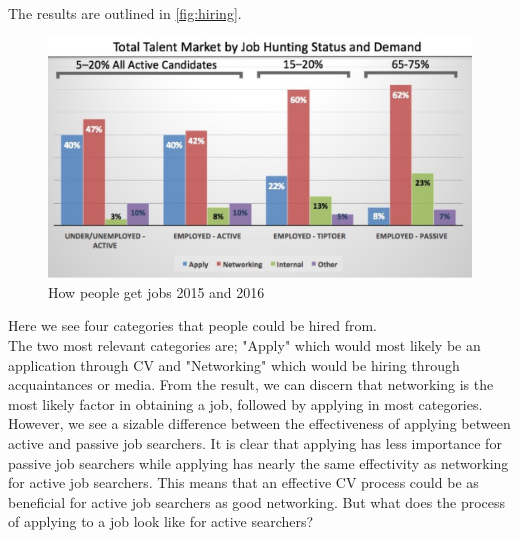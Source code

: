 The results are outlined in \vref{fig:hiring}.
\begin{figure}[H]
   \centering
   \includegraphics[scale = 0.5]{figures/hiringpeople}
   \caption{How people get jobs 2015 and 2016 \cite{Networking}}
   \label{fig:hiring}
 \end{figure}

Here we see four categories that people could be hired from. \\

The two most relevant categories are; "Apply" which would most likely be an application through CV and "Networking" which would be hiring through acquaintances or media.
From the result, we can discern that networking is the most likely factor in obtaining a job, followed by applying in most categories.
However, we see a sizable difference between the effectiveness of applying between active and passive job searchers. 
It is clear that applying has less importance for passive job searchers while applying has nearly the same effectivity as networking for active job searchers. 
This means that an effective CV process could be as beneficial for active job searchers as good networking.
But what does the process of applying to a job look like for active searchers? \\
 
